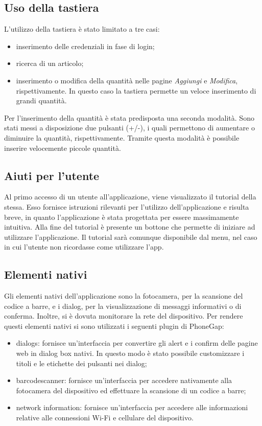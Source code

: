 \documentclass[12pt, a4paper, titlepage]{report}
\begin{document}
	\subsection{Uso della tastiera} \label{tast}
	
	L'utilizzo della tastiera è stato limitato a tre casi:
	\begin{itemize}
		\item inserimento delle credenziali in fase di login;
		\item ricerca di un articolo;
		\item inserimento o modifica della quantità nelle pagine \textit{Aggiungi} e \textit{Modifica}, rispettivamente. In questo caso la tastiera permette un veloce inserimento di grandi quantità.
	\end{itemize}
	Per l'inserimento della quantità è stata predisposta una seconda modalità. Sono stati messi a disposizione due pulsanti (+/-), i quali permettono di aumentare o diminuire la quantità, rispettivamente. Tramite questa modalità è possibile inserire velocemente piccole quantità.
	
	\subsection{Aiuti per l'utente}
	
	Al primo accesso di un utente all'applicazione, viene visualizzato il tutorial della stessa. Esso fornisce istruzioni rilevanti per l'utilizzo dell'applicazione e risulta breve, in quanto l'applicazione è stata progettata per essere massimamente intuitiva. Alla fine del tutorial è presente un bottone che permette di iniziare ad utilizzare l'applicazione. Il tutorial sarà comunque disponibile dal menu, nel caso in cui l'utente non ricordasse come utilizzare l'app.
	
	\subsection{Elementi nativi}
	
	Gli elementi nativi dell'applicazione sono la fotocamera, per la scansione del codice a barre, e i dialog, per la visualizzazione di messaggi informativi o di conferma. Inoltre, si è dovuta monitorare la rete del dispositivo. Per rendere questi elementi nativi si sono utilizzati i seguenti plugin di PhoneGap:
	\begin{itemize}
		\item dialogs: fornisce un'interfaccia per convertire gli alert e i confirm delle pagine web in dialog box nativi. In questo modo è stato possibile customizzare i titoli e le etichette dei pulsanti nei dialog;
		\item barcodescanner: fornisce un'interfaccia per accedere nativamente alla fotocamera del dispositivo ed effettuare la scansione di un codice a barre;
		\item network information: fornisce un'interfaccia per accedere alle informazioni relative alle connessioni Wi-Fi e cellulare del dispositivo.
	\end{itemize}
\end{document}
